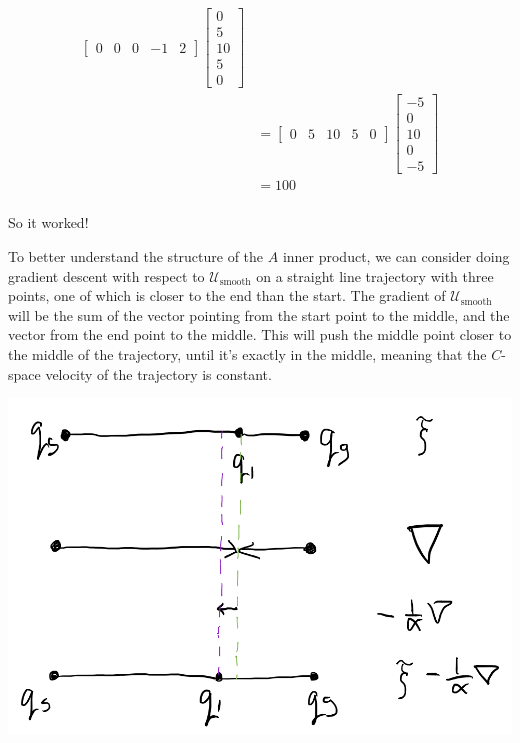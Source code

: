 \documentclass[twoside]{article}
\newcommand{\cus}{\mathcal{U}_\text{smooth}}
\begin{document}
\begin{align*}
\begin{bmatrix}
                    0 & 0 & 0 & -1 & 2
                  \end{bmatrix}
                  \begin{bmatrix}
                    0 \\
                    5 \\
                    10 \\
                    5 \\
                    0
                  \end{bmatrix} \\
                &=\begin{bmatrix}
                    0 & 5 & 10 & 5 & 0
                  \end{bmatrix}
                  \begin{bmatrix}
                    -5 \\
                    0 \\
                    10 \\
                    0 \\
                    -5
                  \end{bmatrix} \\
                &= 100 \\
\end{align*}

So it worked!

To better understand the structure of the $A$ inner product, we can consider doing gradient descent with respect to $\cus$ on a straight line trajectory with three points, one of which is closer to the end than the start. The gradient of $\cus$ will be the sum of the vector pointing from the start point to the middle, and the vector from the end point to the middle. This will push the middle point closer to the middle of the trajectory, until it's exactly in the middle, meaning that the $C$-space velocity of the trajectory is constant.

\begin{center}
\includegraphics[scale=0.3]{figures/gradient_nudge.png}
\end{center}
\end{document}
